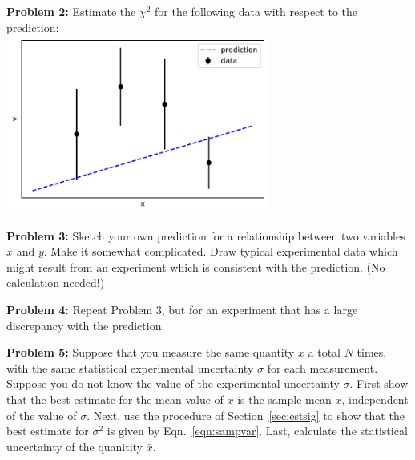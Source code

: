 \documentclass[12pt,oneside]{book}
\begin{document}
\vskip 1cm
\noindent
{\bf Problem 2:} Estimate the $\chi^2$ for the following data with respect to the prediction:\\
{\includegraphics[width=0.65\textwidth]{figs/chisq.pdf}}

\vskip 1cm
\noindent
{\bf Problem 3:} Sketch your own prediction for a relationship between
two variables $x$ and $y$.  Make it somewhat complicated.  Draw
typical experimental data which might result from an
experiment which is consistent with the prediction.  (No calculation
needed!)

\vskip 1cm
\noindent
{\bf Problem 4:} Repeat Problem 3, but for an experiment that has
a large discrepancy with the prediction.

\vskip 1cm
\noindent
{\bf Problem 5:} Suppose that you measure the same quantity $x$ a
total $N$ times, with the same statistical experimental uncertainty
$\sigma$ for each measurement.  Suppose you do not know the value of
the experimental uncertainty $\sigma$.  First show that the best
estimate for the mean value of $x$ is the sample mean $\bar{x}$,
independent of the value of $\sigma$.  Next, use the procedure of
Section~\ref{sec:estsig} to show that the best estimate for $\sigma^2$
is given by Eqn.~\ref{eqn:sampvar}.  Last, calculate the statistical
uncertainty of the quanitity $\bar{x}$.
\end{document}
